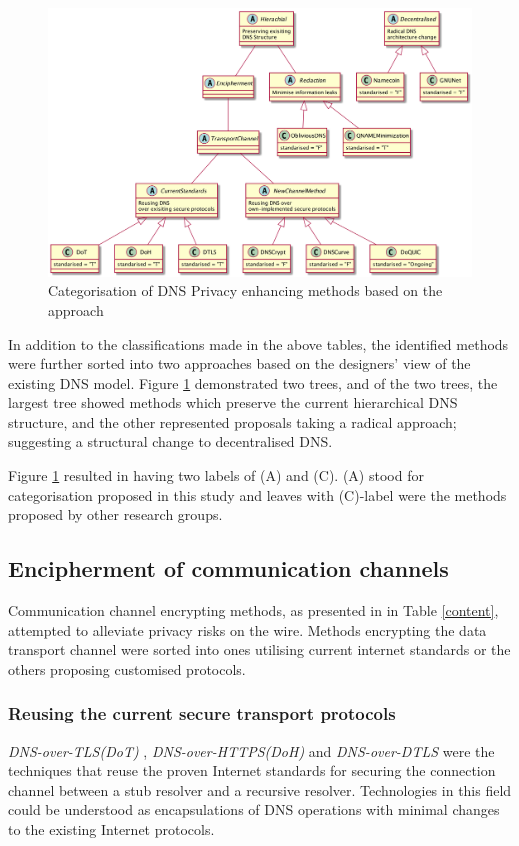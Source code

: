\begin{figure}[h!]
    \begin{center}
    \includegraphics*[width=1\columnwidth]{img/dnsprivacy-classification}
    \end{center}
    \caption{Categorisation of DNS Privacy enhancing methods based on the approach}
    \label{dns-methods-classification}
\end{figure}

In addition to the classifications made in the above tables, the identified methods were further sorted into two approaches based on the designers' view of the existing DNS model.
Figure \ref{dns-methods-classification} demonstrated two trees, and of the two trees, the largest tree showed methods which preserve the current hierarchical DNS structure, and the other represented proposals taking a radical approach; suggesting a structural change to decentralised DNS.

Figure \ref{dns-methods-classification} resulted in having two labels of (A) and (C). (A) stood for categorisation proposed in this study and leaves with (C)-label were the methods proposed by other research groups.  

\subsection{Encipherment of communication channels}
Communication channel encrypting methods, as presented in in Table \ref{content}, attempted to alleviate privacy risks on the wire.
Methods encrypting the data transport channel were sorted into ones utilising current internet standards or the others proposing customised protocols.

\subsubsection{Reusing the current secure transport protocols}
\textit{DNS-over-TLS(DoT)} \cite{rfc7858}, \textit{DNS-over-HTTPS(DoH)} \cite{rfc8484} and \textit{DNS-over-DTLS} \cite{rfc8094} were the techniques that reuse the proven Internet standards for securing the connection channel between a stub resolver and a recursive resolver.
Technologies in this field could be understood as encapsulations of DNS operations with minimal changes to the existing Internet protocols.

